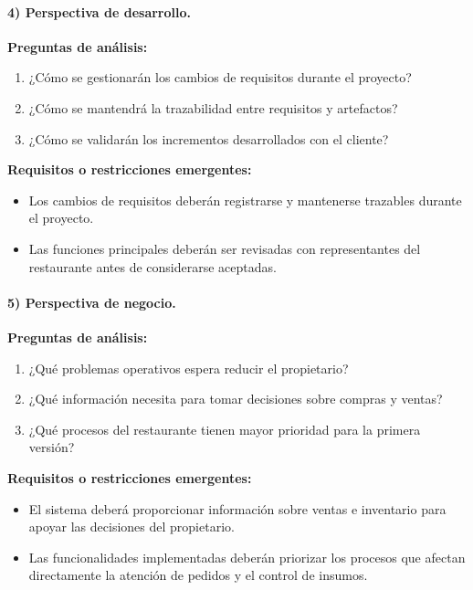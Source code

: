 \paragraph{4) Perspectiva de desarrollo.}

\textbf{Preguntas de análisis:}
\begin{enumerate}
    \item ¿Cómo se gestionarán los cambios de requisitos durante el proyecto?
    \item ¿Cómo se mantendrá la trazabilidad entre requisitos y artefactos?
    \item ¿Cómo se validarán los incrementos desarrollados con el cliente?
\end{enumerate}

\textbf{Requisitos o restricciones emergentes:}
\begin{itemize}
    \item Los cambios de requisitos deberán registrarse y mantenerse
    trazables durante el proyecto.
    \item Las funciones principales deberán ser revisadas con representantes
    del restaurante antes de considerarse aceptadas.
\end{itemize}

\paragraph{5) Perspectiva de negocio.}

\textbf{Preguntas de análisis:}
\begin{enumerate}
    \item ¿Qué problemas operativos espera reducir el propietario?
    \item ¿Qué información necesita para tomar decisiones sobre compras y ventas?
    \item ¿Qué procesos del restaurante tienen mayor prioridad para la primera versión?
\end{enumerate}

\textbf{Requisitos o restricciones emergentes:}
\begin{itemize}
    \item El sistema deberá proporcionar información sobre ventas e inventario
    para apoyar las decisiones del propietario.
    \item Las funcionalidades implementadas deberán priorizar los procesos que
    afectan directamente la atención de pedidos y el control de insumos.
\end{itemize}

